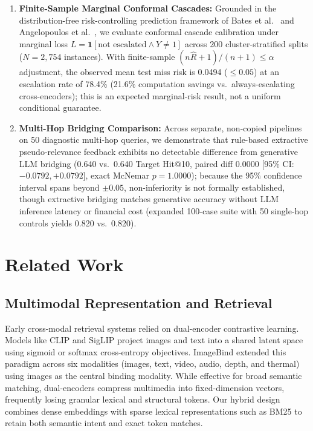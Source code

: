 \documentclass[conference]{IEEEtran}
\begin{document}
\begin{enumerate}
    \item \textbf{Finite-Sample Marginal Conformal Cascades:} Grounded in the distribution-free risk-controlling prediction framework of Bates et al.~\cite{bates2021conformal} and Angelopoulos et al.~\cite{angelopoulos2021gentle}, we evaluate conformal cascade calibration under marginal loss $L = \mathbf{1}[\text{not escalated} \land Y \ne 1]$ across 200 cluster-stratified splits ($N=2{,}754$ instances). With finite-sample $(n\hat{R}+1)/(n+1) \le \alpha$ adjustment, the observed mean test miss risk is 0.0494 ($\le 0.05$) at an escalation rate of 78.4\% (21.6\% computation savings vs.\ always-escalating cross-encoders); this is an expected marginal-risk result, not a uniform conditional guarantee.
    \item \textbf{Multi-Hop Bridging Comparison:} Across separate, non-copied pipelines on 50 diagnostic multi-hop queries, we demonstrate that rule-based extractive pseudo-relevance feedback exhibits no detectable difference from generative LLM bridging (0.640 vs.\ 0.640 Target Hit@10, paired diff $0.0000$ [95\% CI: $-0.0792, +0.0792$], exact McNemar $p = 1.0000$); because the 95\% confidence interval spans beyond $\pm 0.05$, non-inferiority is not formally established, though extractive bridging matches generative accuracy without LLM inference latency or financial cost (expanded 100-case suite with 50 single-hop controls yields 0.820 vs.\ 0.820).
\end{enumerate}

\section{Related Work}

\subsection{Multimodal Representation and Retrieval}
Early cross-modal retrieval systems relied on dual-encoder contrastive learning. Models like CLIP \cite{radford2021clip} and SigLIP \cite{zhai2023siglip} project images and text into a shared latent space using sigmoid or softmax cross-entropy objectives. ImageBind \cite{girdhar2023imagebind} extended this paradigm across six modalities (images, text, video, audio, depth, and thermal) using images as the central binding modality. While effective for broad semantic matching, dual-encoders compress multimedia into fixed-dimension vectors, frequently losing granular lexical and structural tokens. Our hybrid design combines dense embeddings with sparse lexical representations such as BM25 \cite{robertson2009bm25} to retain both semantic intent and exact token matches.
\end{document}
